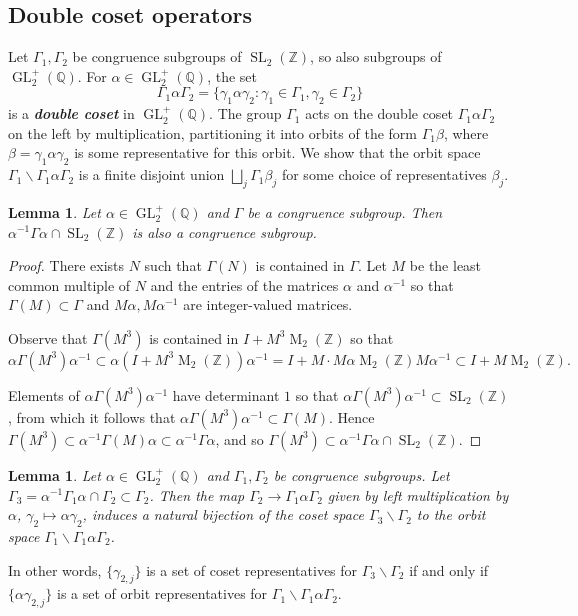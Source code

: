 \documentclass[10pt,leqno,twoside,b5paper]{article}
\theoremstyle{plain}
\newtheorem{lemma}[lem]{Lemma}
\theoremstyle{definition}
\numberwithin{equation}{section}
\numberwithin{lem}{section}
\newcommand{\textib}[1]{\textbf{\textit{#1\index{#1}}}} %
\DeclareMathOperator{\Mat}{M}
\DeclareMathOperator{\GL}{GL}
\DeclareMathOperator{\SL}{SL}
\newcommand{\slz}{\SL_2(\mathbb{Z})}
\newcommand{\glqp}{\GL_2^+(\mathbb{Q})}
\begin{document}
\subsection{Double coset operators}
Let $\varGamma_1,\varGamma_2$ be congruence subgroups of $\slz$, so also subgroups of $\glqp$. For $\alpha\in\glqp$, the set
\[\varGamma_1\alpha\varGamma_2 = \{\gamma_1\alpha\gamma_2 : \gamma_1\in\varGamma_1, \gamma_2\in\varGamma_2\}\] is a \textib{double coset} in $\glqp$. The group $\varGamma_1$ acts on the double coset $\varGamma_1\alpha\varGamma_2$ on the left by multiplication, partitioning it into orbits of the form $\varGamma_1\beta$, where $\beta = \gamma_1\alpha\gamma_2$ is some representative for this orbit. We show that the orbit space  $\varGamma_1\backslash\varGamma_1\alpha\varGamma_2$ is a finite disjoint union $\bigsqcup_j\varGamma_1\beta_j$ for some choice of representatives $\beta_j$.
\begin{lemma}\label{lem: conjugation congruence subgroup}
    Let $\alpha\in\glqp$ and $\varGamma$ be a congruence subgroup. Then $\alpha^{-1}\varGamma\alpha\cap\slz$ is also a congruence subgroup.
\end{lemma}
\begin{proof}
    There exists $N$ such that $\varGamma(N)$ is contained in $\varGamma$. Let $M$ be the least common multiple of $N$ and the entries of the matrices $\alpha$ and $\alpha^{-1}$ so that $\varGamma(M)\subset \varGamma$ and $M\alpha, M\alpha^{-1}$ are integer-valued matrices.
    
    Observe that $\varGamma(M^3)$ is contained in $I + M^3\Mat_2(\mathbb Z)$ so that 
    \[\alpha\varGamma(M^3)\alpha^{-1}\subset \alpha(I + M^3\Mat_2(\mathbb Z))\alpha^{-1} = I + M\cdot M\alpha \Mat_2(\mathbb Z) M\alpha^{-1}\subset I+M\Mat_2(\mathbb{Z}).\]
    
    Elements of $\alpha\varGamma(M^3)\alpha^{-1}$ have determinant $1$ so that $\alpha\varGamma(M^3)\alpha^{-1}\subset \slz$, from which it follows that $\alpha\varGamma(M^3)\alpha^{-1}\subset \varGamma(M)$. Hence $\varGamma(M^3)\subset \alpha^{-1}\varGamma(M)\alpha \subset \alpha^{-1}\varGamma\alpha$, and so $\varGamma(M^3)\subset \alpha^{-1}\varGamma\alpha\cap \slz$.
\end{proof}
\begin{lemma}\label{lem: double coset coset/orbit spaces}
    Let $\alpha\in\glqp$ and $\varGamma_1,\varGamma_2$ be congruence subgroups. Let $\varGamma_3 = \alpha^{-1}\varGamma_1\alpha\cap \varGamma_2\subset \varGamma_2$. Then the map $\varGamma_2\to \varGamma_1\alpha\varGamma_2$ given by left multiplication by $\alpha$, $\gamma_2\mapsto\alpha\gamma_2$, induces a natural bijection of the coset space $\varGamma_3\backslash\varGamma_2$ to the orbit space $\varGamma_1\backslash\varGamma_1\alpha\varGamma_2$.
\end{lemma} In other words, $\{\gamma_{2,j}\}$ is a set of coset representatives for $\varGamma_3\backslash \varGamma_2$ if and only if $\{\alpha\gamma_{2,j}\}$ is a set of orbit representatives for $\varGamma_1\backslash \varGamma_1\alpha\varGamma_2$.
\end{document}
